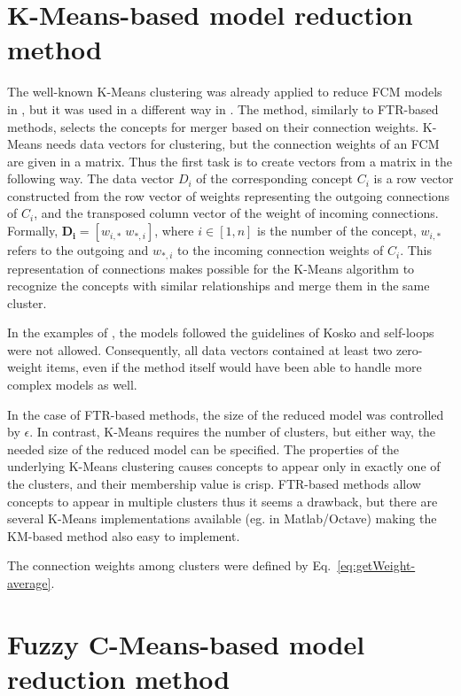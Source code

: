 \documentclass[graybox]{svmult}
\begin{document}
\section{K-Means-based model reduction method}

The well-known K-Means clustering \cite{hartigan1979algorithm} was 
already applied to reduce FCM models in \cite{alizadeh2008using}, but 
it was used in a different way in \cite{hatwagnernovel}. The method, 
similarly to FTR-based methods, selects the concepts for merger based 
on their connection weights. K-Means needs data vectors for clustering, 
but the connection weights of an FCM are given in a matrix. Thus the 
first task is to create vectors from a matrix in the following way. The 
data vector $D_i$ of the corresponding concept $C_i$ is a row vector 
constructed from the row vector of weights representing the outgoing 
connections of $C_i$, and the transposed column vector of the weight of 
incoming connections. Formally, $\mathbf{D_i} = [w_{i,*} \;w_{*,i}]$, 
where $i \in [1, n]$ is the number of the concept, $w_{i,*}$ refers to 
the outgoing and $w_{*,i}$ to the incoming connection weights of $C_i$. 
This representation of connections makes possible for the K-Means 
algorithm to recognize the concepts with similar relationships and merge 
them in the same cluster.

In the examples of \cite{hatwagnernovel}, the models followed the 
guidelines of Kosko and self-loops were not allowed. Consequently, all 
data vectors contained at least two zero-weight items, even if the method 
itself would have been able to handle more complex models as well.

In the case of FTR-based methods, the size of the reduced model was 
controlled by $\epsilon$. In contrast, K-Means requires the number of 
clusters, but either way, the needed size of the reduced model can be 
specified. The properties of the underlying K-Means clustering causes 
concepts to appear only in exactly one of the clusters, and their 
membership value is crisp. FTR-based methods allow concepts to appear 
in multiple clusters thus it seems a drawback, but there are several 
K-Means implementations available (eg. in Matlab/Octave) making the 
KM-based method also easy to implement.

The connection weights among clusters were defined by Eq.~\ref{eq:getWeight-average}.

\section{Fuzzy C-Means-based model reduction method}
\end{document}
